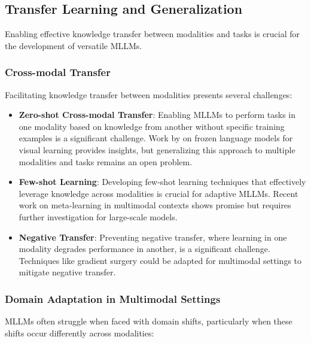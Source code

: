 \subsection{Transfer Learning and Generalization}
Enabling effective knowledge transfer between modalities and tasks is crucial for the development of versatile MLLMs.

\subsubsection{Cross-modal Transfer}
Facilitating knowledge transfer between modalities presents several challenges:

\begin{itemize}
    \item \textbf{Zero-shot Cross-modal Transfer}: Enabling MLLMs to perform tasks in one modality based on knowledge from another without specific training examples is a significant challenge. Work by \citet{tsimpoukelli2021multimodal} on frozen language models for visual learning provides insights, but generalizing this approach to multiple modalities and tasks remains an open problem.
    
    \item \textbf{Few-shot Learning}: Developing few-shot learning techniques that effectively leverage knowledge across modalities is crucial for adaptive MLLMs. Recent work on meta-learning in multimodal contexts \citep{pahde2021multimodal} shows promise but requires further investigation for large-scale models.
    
    \item \textbf{Negative Transfer}: Preventing negative transfer, where learning in one modality degrades performance in another, is a significant challenge. Techniques like gradient surgery \citep{yu2020gradient} could be adapted for multimodal settings to mitigate negative transfer.
\end{itemize}

\subsubsection{Domain Adaptation in Multimodal Settings}
MLLMs often struggle when faced with domain shifts, particularly when these shifts occur differently across modalities:

